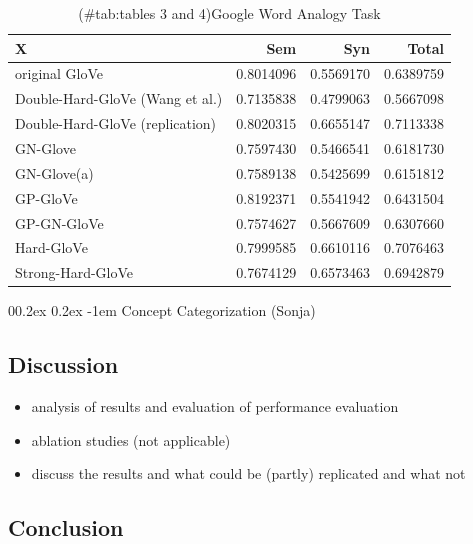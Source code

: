 \documentclass[
  english,
  man,floatsintext]{apa6}
\makeatletter
\providecommand{\tightlist}{%
  \setlength{\itemsep}{0pt}\setlength{\parskip}{0pt}}
\let\oldparagraph\paragraph
\renewcommand{\paragraph}[1]{\oldparagraph{#1}\mbox{}}
\renewcommand{\paragraph}{\@startsection{paragraph}{4}{\parindent}%
  {0\baselineskip \@plus 0.2ex \@minus 0.2ex}%
  {-1em}%
  {\normalfont\normalsize\bfseries\itshape\typesectitle}}
\makeatother
\begin{document}
\begin{table}

\caption{(\#tab:tables 3 and 4)Google Word Analogy Task}
\centering
\begin{tabular}[t]{l|r|r|r}
\hline
X & Sem & Syn & Total\\
\hline
original GloVe & 0.8014096 & 0.5569170 & 0.6389759\\
\hline
Double-Hard-GloVe (Wang et al.) & 0.7135838 & 0.4799063 & 0.5667098\\
\hline
Double-Hard-GloVe (replication) & 0.8020315 & 0.6655147 & 0.7113338\\
\hline
GN-Glove & 0.7597430 & 0.5466541 & 0.6181730\\
\hline
GN-Glove(a) & 0.7589138 & 0.5425699 & 0.6151812\\
\hline
GP-GloVe & 0.8192371 & 0.5541942 & 0.6431504\\
\hline
GP-GN-GloVe & 0.7574627 & 0.5667609 & 0.6307660\\
\hline
Hard-GloVe & 0.7999585 & 0.6610116 & 0.7076463\\
\hline
Strong-Hard-GloVe & 0.7674129 & 0.6573463 & 0.6942879\\
\hline
\end{tabular}
\end{table}

\hypertarget{concept-categorization-sonja}{%
\paragraph{Concept Categorization (Sonja)}\label{concept-categorization-sonja}}

\hypertarget{discussion}{%
\subsection{Discussion}\label{discussion}}

\begin{itemize}
\tightlist
\item
  analysis of results and evaluation of performance evaluation
\item
  ablation studies (not applicable)
\item
  discuss the results and what could be (partly) replicated and what not
\end{itemize}

\hypertarget{conclusion}{%
\subsection{Conclusion}\label{conclusion}}
\end{document}
